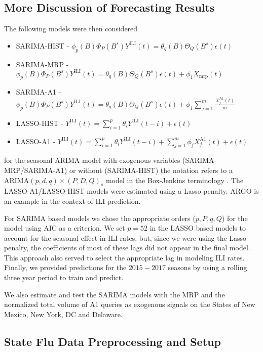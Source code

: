 \documentclass[12pt]{article}
\begin{document}
\subsection{More Discussion of Forecasting Results}

The following models were then considered
\begin{itemize}
\item SARIMA-HIST - $\phi_p(B)\Phi_P(B^s)Y^{\text{ILI}}(t) = \theta_q(B)\Theta_Q(B^s)\epsilon(t)$ \item SARIMA-MRP - $\phi_p(B)\Phi_P(B^s)Y^{\text{ILI}}(t) =  \theta_q(B)\Theta_Q(B^s)\epsilon(t) + \phi_1 X_{\text{mrp}}(t)$ 
\item SARIMA-A1 - $\phi_p(B)\Phi_P(B^s)Y^{\text{ILI}}(t) =  \theta_q(B)\Theta_Q(B^s)\epsilon(t) + \phi_1 \sum_{j=1}^m \frac{X_j^{\text{A1}}(t)}{m}$ 
\item LASSO-HIST - $Y^{\text{ILI}}(t) = \sum_{i=1}^p \theta_i Y^{\text{ILI}}(t-i)+\epsilon(t)$
\item LASSO-A1 - $Y^{\text{ILI}}(t) = \sum_{i=1}^p \theta_i Y^{\text{ILI}}(t-i) +  \sum_{j=1}^m \phi_j X_j^{\text{A1}}(t) + \epsilon(t)$
\end{itemize}
for the seasonal ARIMA model with exogenous variables (SARIMA-MRP/SARIMA-A1) or without (SARIMA-HIST) the notation refers to a ARIMA$(p,d,q)\times(P,D,Q)_s$ model in the Box-Jenkins terminology \cite{box_etal_2015}. The LASSO-A1/LASSO-HIST models were estimated using a Lasso penalty. ARGO \cite{yang_etal_2015inference, yang_etal_2015} is an example in the context of ILI prediction.  

For SARIMA based models we chose the appropriate orders ($p,P,q,Q$) for the model using AIC as a criterion. We set $p=52$ in the LASSO based models to account for the seasonal effect in ILI rates, but, since we were using the Lasso penalty, the coefficients of most of these lags did not appear in the final model. This approach also served to select the appropriate lag in modeling ILI rates. Finally, we provided predictions for the $2015-2017$ seasons by using a rolling three year period to train and predict.

We also estimate and test the SARIMA models with the MRP and the normalized total volume of A1 queries as exogenous signals on the States of New Mexico, New York, DC and Delaware. 

\subsection{State Flu Data Preprocessing and Setup}
\end{document}
